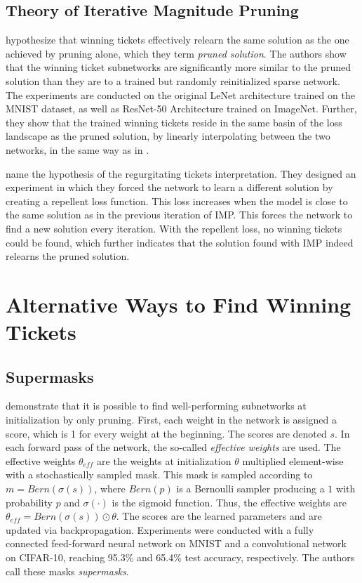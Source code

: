 \subsection{Theory of Iterative Magnitude Pruning}
\textcite{WhyLotteryTicketsWin} hypothesize that winning tickets effectively relearn the same solution as the one achieved by pruning alone, which they term \textit{pruned solution}.
The authors show that the winning ticket subnetworks are significantly more similar to the pruned solution than they are to a trained but randomly reinitialized sparse network.
The experiments are conducted on the original LeNet architecture trained on the MNIST dataset, as well as ResNet-50 Architecture trained on ImageNet. Further, they show that the trained winning tickets reside in the same basin of the loss landscape as the pruned solution, by linearly interpolating between the two networks, in the same way as in \autocite{LinearModeConnectivity}.

\textcite{maene_towards_2021} name the hypothesis of \autocite{WhyLotteryTicketsWin} the regurgitating tickets interpretation.
They designed an experiment in which they forced the network to learn a different solution by creating a repellent loss function.
This loss increases when the model is close to the same solution as in the previous iteration of {IMP}.
This forces the network to find a new solution every iteration.
With the repellent loss, no winning tickets could be found, which further indicates that the solution found with {IMP} indeed relearns the pruned solution.

\section{Alternative Ways to Find Winning Tickets}
\subsection{Supermasks}
\textcite{Supermasks} demonstrate that it is possible to find well-performing subnetworks at initialization by only pruning.
First, each weight in the network is assigned a score, which is 1 for every weight at the beginning. 
The scores are denoted $s$.
In each forward pass of the network, the so-called \textit{effective weights} are used.
The effective weights $\theta_{eff}$ are the weights at initialization $\theta$ multiplied element-wise with a stochastically sampled mask.
This mask is sampled according to $m = \textit{Bern}(\sigma(s))$, where $\textit{Bern}(p)$ is a Bernoulli sampler producing a $1$ with probability $p$ and $\sigma(\cdot)$ is the sigmoid function. 
Thus, the effective weights are $\theta_{eff} = \textit{Bern}(\sigma(s)) \odot \theta$.
The scores are the learned parameters and are updated via backpropagation.
Experiments were conducted with a fully connected feed-forward neural network on MNIST and a convolutional network on CIFAR-10, reaching 95.3\% and 65.4\% test accuracy, respectively.
The authors call these masks \textit{supermasks}.

